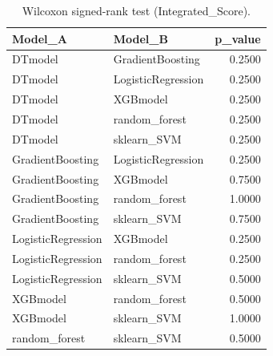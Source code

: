 \begin{table}[t]
\centering
\begin{tabular}{llr}
\toprule
Model_A & Model_B & p_value \\
\midrule
DTmodel & GradientBoosting & 0.2500 \\
DTmodel & LogisticRegression & 0.2500 \\
DTmodel & XGBmodel & 0.2500 \\
DTmodel & random_forest & 0.2500 \\
DTmodel & sklearn_SVM & 0.2500 \\
GradientBoosting & LogisticRegression & 0.2500 \\
GradientBoosting & XGBmodel & 0.7500 \\
GradientBoosting & random_forest & 1.0000 \\
GradientBoosting & sklearn_SVM & 0.7500 \\
LogisticRegression & XGBmodel & 0.2500 \\
LogisticRegression & random_forest & 0.2500 \\
LogisticRegression & sklearn_SVM & 0.5000 \\
XGBmodel & random_forest & 0.5000 \\
XGBmodel & sklearn_SVM & 1.0000 \\
random_forest & sklearn_SVM & 0.5000 \\
\bottomrule
\end{tabular}
\caption{Wilcoxon signed-rank test (Integrated_Score).}
\label{tab:wilcoxon_Integrated_Score}
\end{table}